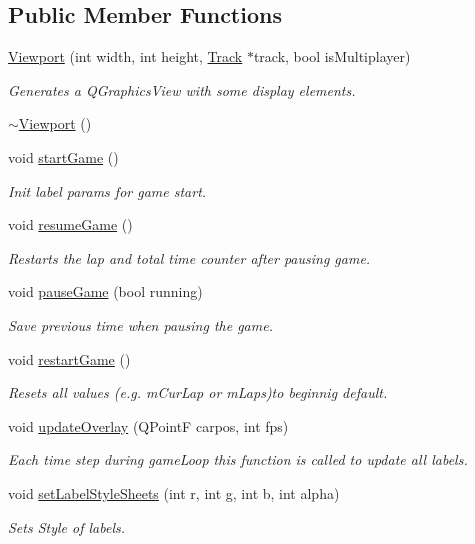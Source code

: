 \subsection*{Public Member Functions}
\begin{DoxyCompactItemize}
\item 
\mbox{\hyperlink{class_viewport_a2beed15ff9b285141d86763168432b07}{Viewport}} (int width, int height, \mbox{\hyperlink{class_track}{Track}} $\ast$track, bool is\+Multiplayer)
\begin{DoxyCompactList}\small\item\em Generates a Q\+Graphics\+View with some display elements. \end{DoxyCompactList}\item 
\mbox{\hyperlink{class_viewport_a1e18a1ff4a52be33ef63d25034561850}{$\sim$\+Viewport}} ()
\item 
void \mbox{\hyperlink{class_viewport_aaa69f6d1141316cace3925e861189b3c}{start\+Game}} ()
\begin{DoxyCompactList}\small\item\em Init label params for game start. \end{DoxyCompactList}\item 
void \mbox{\hyperlink{class_viewport_a42c6a6a3ae0978cb4fd35e0fc7eff894}{resume\+Game}} ()
\begin{DoxyCompactList}\small\item\em Restarts the lap and total time counter after pausing game. \end{DoxyCompactList}\item 
void \mbox{\hyperlink{class_viewport_a154be67b66998968a60df76042438b4b}{pause\+Game}} (bool running)
\begin{DoxyCompactList}\small\item\em Save previous time when pausing the game. \end{DoxyCompactList}\item 
void \mbox{\hyperlink{class_viewport_af4f56a75c3b96e1dd9d63bb469e3adc7}{restart\+Game}} ()
\begin{DoxyCompactList}\small\item\em Resets all values (e.\+g. m\+Cur\+Lap or m\+Laps)to beginnig default. \end{DoxyCompactList}\item 
void \mbox{\hyperlink{class_viewport_a11b053c166cbf98f4323bb7b7449b462}{update\+Overlay}} (Q\+PointF carpos, int fps)
\begin{DoxyCompactList}\small\item\em Each time step during game\+Loop this function is called to update all labels. \end{DoxyCompactList}\item 
void \mbox{\hyperlink{class_viewport_a7fd5efb74f43412ff49ca90632388a6d}{set\+Label\+Style\+Sheets}} (int r, int g, int b, int alpha)
\begin{DoxyCompactList}\small\item\em Sets Style of labels. \end{DoxyCompactList}\end{DoxyCompactItemize}


